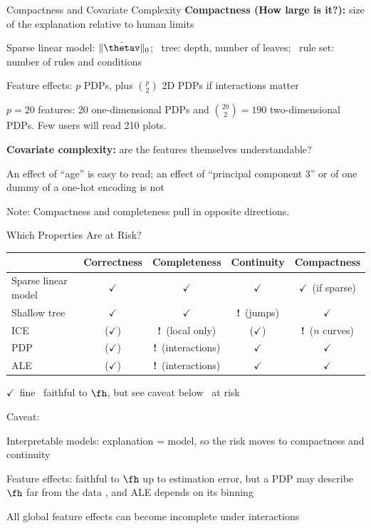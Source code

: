 \documentclass[10pt,compress,t,notes=noshow, xcolor=table]{beamer}
\newcommand{\ok}{{\color{evblue!80!black}$\checkmark$}}
\newcommand{\okc}{{\color{evblue!80!black}($\checkmark$)}}
\newcommand{\riskmark}{{\color{evorange}\textbf{!}}}
\begin{document}
\begin{framev}[align=mid]{Compactness and Covariate Complexity}
\textbf{Compactness (How large is it?):} size of the explanation relative to human limits
\begin{itemizeS}
\item Sparse linear model: $\|\hat\thetav\|_0$; \ tree: depth, number of leaves; \ rule set: number of rules and conditions
\item Feature effects: $p$ PDPs, plus $\binom{p}{2}$ 2D PDPs if interactions matter
\end{itemizeS}
\begin{example}
$p = 20$ features: 20 one-dimensional PDPs and $\binom{20}{2} = 190$ two-dimensional PDPs. Few users will read 210 plots.
\end{example}
\spacer[0.4] \pause
\textbf{Covariate complexity:} are the features themselves understandable?
\begin{itemizeS}
\item An effect of ``age'' is easy to read; an effect of ``principal component 3'' or of one dummy of a one-hot encoding is not
\end{itemizeS}
\spacer[0.4]
\pause
Note: Compactness and completeness pull in opposite directions.
\end{framev}


\begin{framev}[align=mid]{Which Properties Are at Risk?}
\centering\small
\renewcommand{\arraystretch}{1.3}
\begin{tabular}{@{}lcccc@{}}
\toprule
 & Correctness & Completeness & Continuity & Compactness \\
\midrule
Sparse linear model & \ok & \ok & \ok & \ok \ (if sparse) \\
Shallow tree & \ok & \ok & \riskmark\ (jumps) & \ok \\
ICE & \okc & \riskmark\ (local only) & \okc & \riskmark\ ($n$ curves) \\
PDP & \okc & \riskmark\ (interactions) & \ok & \ok \\
ALE & \okc & \riskmark\ (interactions) & \ok & \ok \\
\bottomrule
\end{tabular}
\spacer[0.3]

{\scriptsize \ok\ fine \quad \okc\ faithful to $\fh$, but see caveat below \quad \riskmark\ at risk}
\spacer[0.6]
\raggedright

\pause

Caveat:
\begin{itemizeS}
\item Interpretable models: explanation = model, so the risk moves to compactness and continuity
\item Feature effects: faithful to $\fh$ up to estimation error, but a PDP may describe $\fh$ far from the data , and ALE depends on its binning
\item All global feature effects can become incomplete under interactions
\end{itemizeS}
\end{framev}
\end{document}

